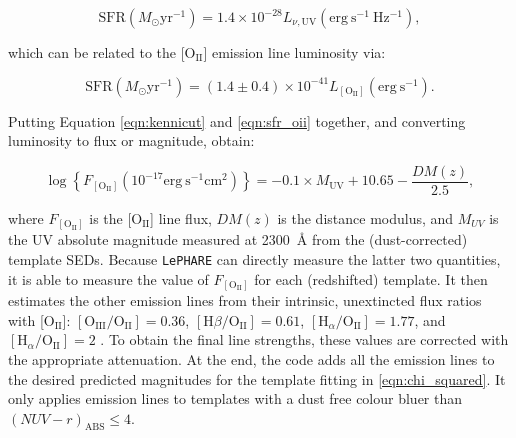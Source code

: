 
\begin{equation}
\mathrm{SFR} (M_{\odot}\mathrm{yr^{-1}} ) = 1.4 \times 10^{-28} L_{\nu,\mathrm{UV}} (\mathrm{erg \ s^{-1} \ Hz^{-1}} ),\label{eqn:kennicut}
\end{equation} 

\noindent which can be related to the [$\mathrm{O_{II}}$] emission line luminosity via:

\begin{equation}
\mathrm{SFR} (M_{\odot}\mathrm{yr^{-1}}) = (1.4 \pm 0.4) \times 10^{-41} L_{[\mathrm{O_{II}}]} (\mathrm{erg \ s^{-1}}).\label{eqn:sfr_oii}
\end{equation}

Putting Equation \ref{eqn:kennicut} and \ref{eqn:sfr_oii} together, and converting luminosity to flux or magnitude, \cite{2009ApJ...690.1236I} obtain:


\begin{equation}
\log{ \left\{ F_{[\mathrm{O_{II}}]}(10^{-17}\mathrm{erg \ s^{-1} cm^2}) \right\} } = -0.1 \times M_{\mathrm{UV}} +10.65 -\frac{DM(z)}{2.5},
\end{equation}

\noindent where $F_{[\mathrm{O_{II}}]}$ is the [$\mathrm{O_{II}}$] line flux, $DM(z)$ is the distance modulus, and $M_{UV}$ is the UV absolute magnitude measured at \SI{2300}{\angstrom} from the (dust-corrected) template SEDs. Because \texttt{LePHARE} can directly measure the latter two quantities, it is able to measure the value of $F_{[\mathrm{O_{II}}]}$ for each (redshifted) template. It then estimates the other emission lines from their intrinsic, unextincted flux ratios with [$\mathrm{O_{II}}$]: $[\mathrm{O_{III}/O_{II}}]=0.36$, $[\mathrm{H}\beta/\mathrm{O_{II}}] = 0.61$, $[\mathrm{H}_{\alpha}/\mathrm{O_{II}}] =1.77$, and $[\mathrm{H}_{\alpha}/\mathrm{O_{II}}] = 2$ \citep{1985ApJS...57....1M,2006ApJ...642..775M,2005MNRAS.362.1143M,1998ARA&A..36..189K}. To obtain the final line strengths, these values are corrected with the appropriate attenuation. At the end, the code adds all the emission lines to the desired predicted magnitudes for the template fitting in \ref{eqn:chi_squared}. It only applies emission lines to templates with a dust free colour bluer than $(NUV-r)_{\mathrm{ABS}} \leq 4$. \par


